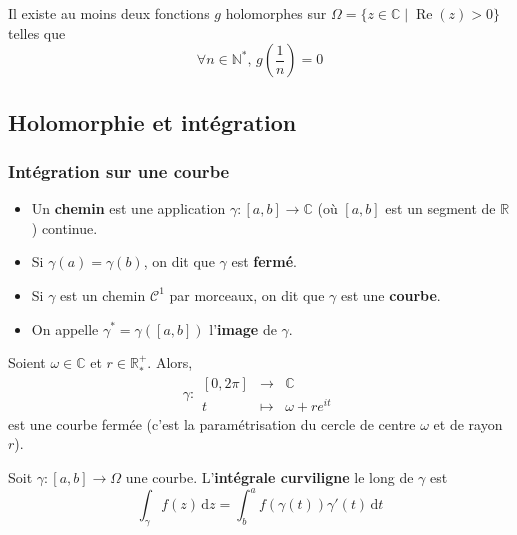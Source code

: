 	\begin{cexample}
		Il existe au moins deux fonctions $g$ holomorphes sur $\Omega = \{ z \in \mathbb{C} \mid \operatorname{Re}(z) > 0 \}$ telles que
		\[ \forall n \in \mathbb{N}^*, \, g\left( \frac{1}{n} \right) = 0 \]
	\end{cexample}

	\subsection{Holomorphie et intégration}

	\subsubsection{Intégration sur une courbe}


	\begin{definition}
		\begin{itemize}
			\item Un \textbf{chemin} est une application $\gamma : [a,b] \rightarrow \mathbb{C}$ (où $[a,b]$ est un segment de $\mathbb{R}$) continue.
			\item Si $\gamma(a) = \gamma(b)$, on dit que $\gamma$ est \textbf{fermé}.
			\item Si $\gamma$ est un chemin $\mathcal{C}^1$ par morceaux, on dit que $\gamma$ est une \textbf{courbe}.
			\item On appelle $\gamma^* = \gamma([a,b])$ l'\textbf{image} de $\gamma$.
		\end{itemize}
	\end{definition}

	\begin{example}
		Soient $\omega \in \mathbb{C}$ et $r \in \mathbb{R}^+_*$. Alors,
		\[
			\gamma :
			\begin{array}{ccc}
				[0,2\pi] &\rightarrow& \mathbb{C} \\
				t &\mapsto& \omega + re^{it}
			\end{array}
		\]
		est une courbe fermée (c'est la paramétrisation du cercle de centre $\omega$ et de rayon $r$).
	\end{example}

	\begin{definition}
		Soit $\gamma : [a,b] \rightarrow \Omega$ une courbe. L'\textbf{intégrale curviligne} le long de $\gamma$ est
		\[ \int_\gamma f(z) \, \mathrm{d}z = \int_b^a f(\gamma(t)) \gamma'(t) \, \mathrm{d}t \]
	\end{definition}

